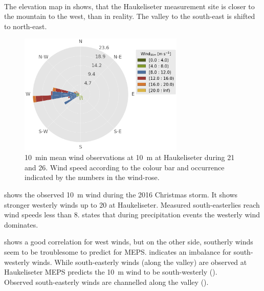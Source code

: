 \\
The elevation map in  shows, that the Haukeliseter measurement site is closer to the mountain to the west, than in reality. The valley to the south-east is shifted to north-east. 
\par\medskip
\noindent
\begin{figure}[!t]
	\centering
	\includegraphics[width=0.7\textwidth]{./fig_windrose/20161221_26}
	\caption{\SI{10}{\minute} mean wind observations at \SI{10}{\metre} at Haukeliseter during \num{21} and \SI{26}{\dec}. Wind speed according to the colour bar and occurrence indicated by the numbers in the wind-rose. }\label{fig:windrose}
\end{figure}
\noindent
{} shows the observed \SI{10}{\metre} wind during the 2016 Christmas storm. It shows stronger westerly winds up to \SI{20}{\mPs} at Haukeliseter. Measured south-easterlies reach wind speeds less than \SI{8}{\mPs}. \citet{wolff_new_2010} states that during precipitation events the westerly wind dominates.
\par\medskip
\noindent
 shows a good correlation for west winds, but on the other side, southerly winds seem to be troublesome to predict for MEPS. 
 indicates an imbalance for south-westerly winds. While south-easterly winds (along the valley) are observed at Haukeliseter MEPS predicts the \SI{10}{\metre} wind to be south-westerly (). 
\\
Observed south-easterly winds are channelled along the valley (). %
